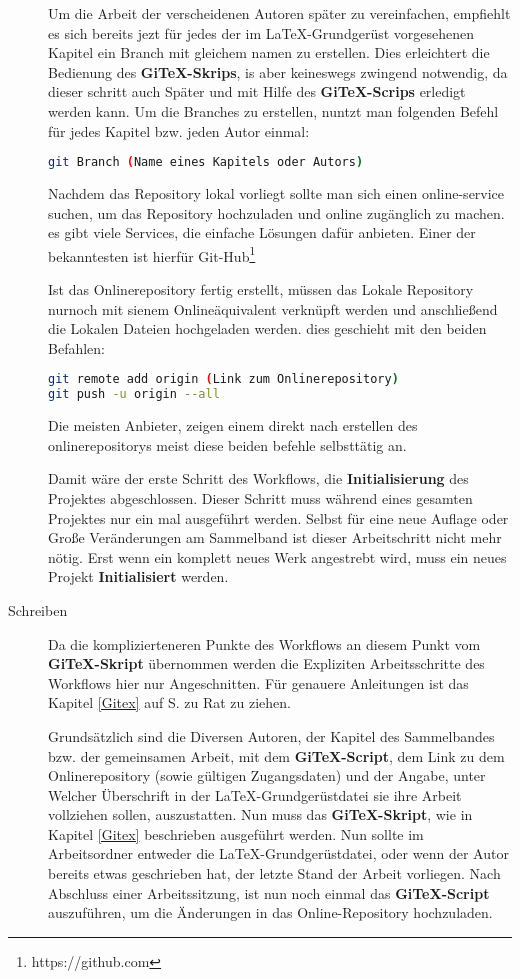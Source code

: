 \documentclass[12pt,a4paper]{scrartcl}
\begin{document}
\begin{description}
Um die Arbeit der verscheidenen Autoren später zu vereinfachen, empfiehlt es sich bereits jezt für jedes der im \LaTeX -Grundgerüst vorgesehenen Kapitel ein Branch mit gleichem namen zu erstellen. Dies erleichtert die Bedienung des \textbf{GiTeX-Skrips}, is aber keineswegs zwingend notwendig, da dieser schritt auch Später und mit Hilfe des \textbf{GiTeX-Scrips} erledigt werden kann. Um die Branches zu erstellen, nuntzt man folgenden Befehl für jedes Kapitel bzw. jeden Autor einmal:

\begin{lstlisting}[language=bash]
git Branch (Name eines Kapitels oder Autors)
\end{lstlisting}


Nachdem das Repository lokal vorliegt sollte man sich einen online-service suchen, um das Repository hochzuladen und online zugänglich zu machen. es gibt viele Services, die einfache Lösungen dafür anbieten. Einer der bekanntesten ist hierfür Git-Hub\footnote{https://github.com}

Ist das Onlinerepository fertig erstellt, müssen das Lokale Repository nurnoch mit sienem Onlineäquivalent verknüpft werden und anschließend die Lokalen Dateien hochgeladen werden. dies geschieht mit den beiden Befahlen:
\begin{lstlisting}[language=bash]
git remote add origin (Link zum Onlinerepository)
git push -u origin --all
\end{lstlisting} 
Die meisten Anbieter, zeigen einem direkt nach erstellen des onlinerepositorys meist diese beiden befehle selbsttätig an.

Damit wäre der erste Schritt des Workflows, die \textbf{Initialisierung} des Projektes abgeschlossen. Dieser Schritt muss während eines gesamten Projektes nur ein mal ausgeführt werden. Selbst für eine neue Auflage oder Große Veränderungen am Sammelband ist dieser Arbeitschritt nicht mehr nötig. Erst wenn ein komplett neues Werk angestrebt wird, muss ein neues Projekt \textbf{Initialisiert} werden.
\item[Schreiben] 
Da die komplizierteneren Punkte des Workflows an diesem Punkt vom  \textbf{GiTeX-Skript} übernommen werden die Expliziten Arbeitsschritte des Workflows hier nur Angeschnitten. Für genauere Anleitungen ist das Kapitel \ref{Gitex} auf S. \pageref{Gitex} zu Rat zu ziehen.

Grundsätzlich sind die Diversen Autoren, der Kapitel des Sammelbandes bzw. der gemeinsamen Arbeit, mit dem \textbf{GiTeX-Script}, dem Link zu dem Onlinerepository (sowie gültigen Zugangsdaten) und der Angabe, unter Welcher Überschrift in der \LaTeX -Grundgerüstdatei sie ihre Arbeit vollziehen sollen, auszustatten. Nun muss das \textbf{GiTeX-Skript}, wie in Kapitel \ref{Gitex} beschrieben ausgeführt werden. Nun sollte im Arbeitsordner entweder die \LaTeX -Grundgerüstdatei, oder wenn der Autor bereits etwas geschrieben hat, der letzte Stand der Arbeit vorliegen. Nach Abschluss einer Arbeitssitzung, ist nun noch einmal das \textbf{GiTeX-Script} auszuführen, um die Änderungen in das Online-Repository hochzuladen.


\end{description}
\end{document}
